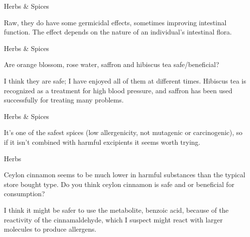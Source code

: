 \documentclass[11pt,oneside,openany,extrafontsizes]{memoir}
\begin{document}
\begin{standalonequote}{Herbs \& Spices}

    \begin{answer}
        Raw, they do have some germicidal effects, sometimes improving intestinal function. The effect depends on the nature of an individual's intestinal flora.
    \end{answer}
\end{standalonequote}

\begin{qaexchange}{Herbs \& Spices}

    \begin{question}
        Are orange blossom, rose water, saffron and hibiscus tea safe/beneficial?
    \end{question}

    \begin{answer}
        I think they are safe; I have enjoyed all of them at different times. Hibiscus tea is recognized as a treatment for high blood pressure, and saffron has been used successfully for treating many problems.
    \end{answer}
\end{qaexchange}

\begin{standalonequote}{Herbs \& Spices}

    \begin{answer}
        It's one of the safest spices (low allergenicity, not mutagenic or carcinogenic), so if it isn't combined with harmful excipients it seems worth trying.
    \end{answer}
\end{standalonequote}

\begin{qaexchange}{Herbs}

    \begin{question}
        Ceylon cinnamon seems to be much lower in harmful substances than the typical store bought type. Do you think ceylon cinnamon is safe and or beneficial for consumption?
    \end{question}

    \begin{answer}
        I think it might be safer to use the metabolite, benzoic acid, because of the reactivity of the cinnamaldehyde, which I suspect might react with larger molecules to produce allergens.
    \end{answer}
\end{qaexchange}
\end{document}
